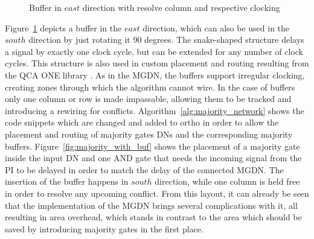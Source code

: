 \begin{figure}
	\caption{Buffer in $east$ direction with resolve column and respective clocking}\label{fig:QCA_buf}
\end{figure}

Figure~\ref{fig:QCA_buf} depicts a buffer in the $east$ direction, which can also be used in the $south$ direction by just rotating it 90 degrees. The snake-shaped structure delays a signal by exactly one clock cycle, but can be extended for any number of clock cycles. This structure is also used in custom placement and routing resulting from the QCA ONE library \cite{QCA_scl}. As in the MGDN, the buffers support irregular clocking, creating zones through which the algorithm cannot wire. In the case of buffers only one column or row is made impassable, allowing them to be tracked and introducing a rewiring for conflicts. Algorithm~\ref{alg:majority_network} shows the code snippets which are changed and added to ortho in order to allow the placement and routing of majority gates DNs and the corresponding majority buffers. Figure~\ref{fig:majority_with_buf} shows the placement of a majority gate inside the input DN and one AND gate that needs the incoming signal from the PI to be delayed in order to match the delay of the connected MGDN. The insertion of the buffer happens in $south$ direction, while one column is held free in order to resolve any upcoming conflict. From this layout, it can already be seen that the implementation of the MGDN brings several complications with it, all resulting in area overhead, which stands in contrast to the area which should be saved by introducing majority gates in the first place.

